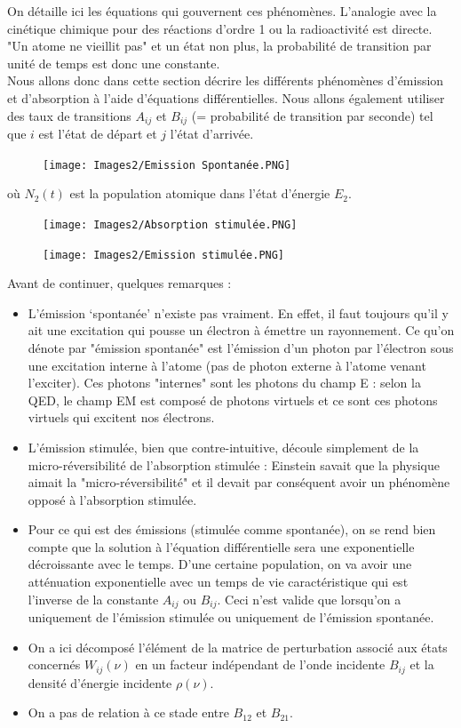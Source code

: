 On détaille ici les équations qui gouvernent ces phénomènes. L'analogie avec la cinétique chimique pour des réactions d'ordre 1 ou la radioactivité est directe. "Un atome ne vieillit pas" et un état non plus, la probabilité de transition par unité de temps est donc une constante.\\
Nous allons donc dans cette section décrire les différents phénomènes d'émission et d'absorption à l'aide d'équations différentielles. Nous allons également utiliser des taux de transitions $A_{ij}$ et $B_{ij}$ (= probabilité de transition par seconde) tel que $i$ est l'état de départ et $j$ l'état d'arrivée.
\begin{figure}[htp]
    \centering
    \texttt{[image: Images2/Emission Spontanée.PNG]}
    \label{fig:emission_spont}
\end{figure}
où $N_2(t)$ est la population atomique dans l'état d'énergie $E_2$.
\begin{figure}[htp]
    \texttt{[image: Images2/Absorption stimulée.PNG]}
    \label{fig:absorb_stimul}
\end{figure}
\begin{figure}[htp]
    \texttt{[image: Images2/Emission stimulée.PNG]}
    \label{fig:emission_stimul}
\end{figure}
Avant de continuer, quelques remarques :
\begin{itemize}[label=$\bullet$]
    \item L'émission `spontanée' n'existe pas vraiment. En effet, il faut toujours qu'il y ait une excitation qui pousse un électron à émettre un rayonnement. Ce qu'on dénote par "émission spontanée" est l'émission d'un photon par l'électron sous une excitation interne à l'atome (pas de photon externe à l'atome venant l'exciter). Ces photons "internes" sont les photons du champ E : selon la QED, le champ EM est composé de photons virtuels et ce sont ces photons virtuels qui excitent nos électrons.
    \item L'émission stimulée, bien que contre-intuitive, découle simplement de la micro-réversibilité de l'absorption stimulée : Einstein savait que la physique aimait la "micro-réversibilité" et il devait par conséquent avoir un phénomène opposé à l'absorption stimulée.
    \item Pour ce qui est des émissions (stimulée comme spontanée), on se rend bien compte que la solution à l'équation différentielle sera une exponentielle décroissante avec le temps. D'une certaine population, on va avoir une atténuation exponentielle avec un temps de vie caractéristique qui est l'inverse de la constante $A_{ij}$ ou $B_{ij}$. Ceci n'est valide que lorsqu'on a uniquement de l'émission stimulée ou uniquement de l'émission spontanée.
    \item On a ici décomposé l'élément de la matrice de perturbation associé aux états concernés $W_{ij}(\nu)$ en un facteur indépendant de l'onde incidente $B_{ij}$ et la densité d'énergie incidente $\rho(\nu)$.
    \item On a pas de relation à ce stade entre $B_{12}$ et $B_{21}$.
\end{itemize}
